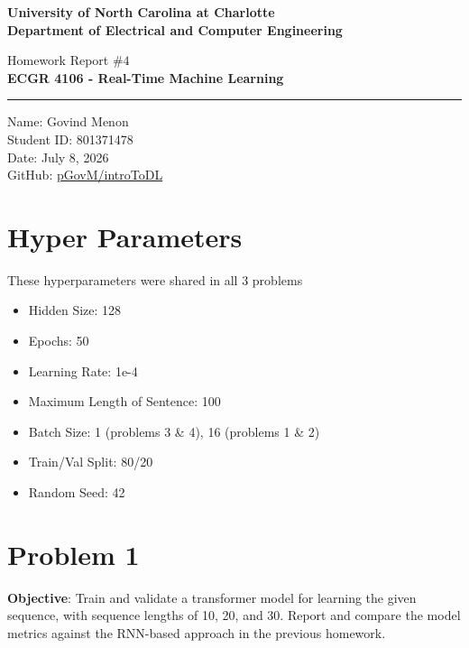 \documentclass[a4paper]{article}
\begin{document}
\begin{titlepage}
    \thispagestyle{fancy}
    \renewcommand{\headrulewidth}{0pt}
    \begin{center}
        \vspace*{2cm}

        \LARGE\textbf{University of North Carolina at Charlotte\\
                        Department of Electrical and Computer Engineering}
        
        \vspace*{4cm}

        Homework Report $\# 4$ \\
        \Large\textbf{ECGR 4106 - Real-Time Machine Learning} \\
        
        \noindent\rule{14cm}{0.4pt}

        \vspace*{3cm}

        Name: Govind Menon \\
        Student ID: 801371478 \\
        Date: July 8, 2026 \\
        GitHub: \href{https://github.com/pGovm/introToDL.git}{pGovM/introToDL}

    \end{center}
\end{titlepage}

\section{\textbf{\textbf{Hyper Parameters}}}
These hyperparameters were shared in all 3 problems 

\begin{itemize}
    \item Hidden Size: 128
    \item Epochs: 50
    \item Learning Rate: 1e-4
    \item Maximum Length of Sentence: 100
    \item Batch Size: 1 (problems 3 \& 4), 16 (problems 1 \& 2)
    \item Train/Val Split: 80/20
    \item Random Seed: 42
\end{itemize}

\section*{\textbf{Problem 1}}
\textbf{Objective}: Train and validate a transformer model for learning the given sequence, with sequence lengths of 10, 20, and 30. Report and compare the model metrics against the  RNN-based approach in the previous homework.
\end{document}
